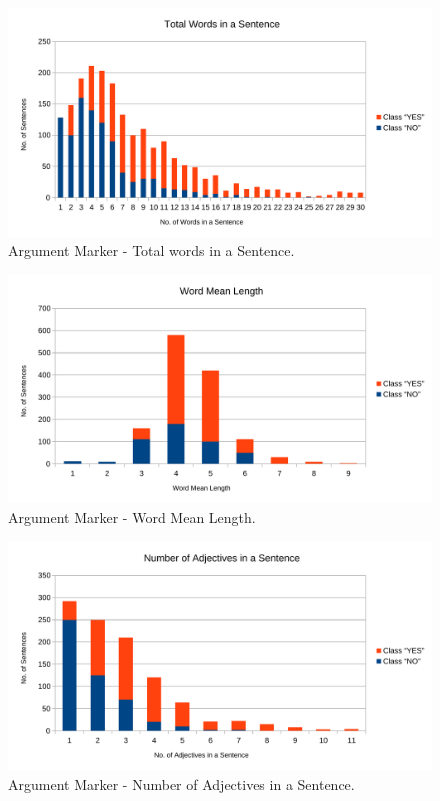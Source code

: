 \begin{figure}[H]
\centering
\includegraphics[width=0.8\linewidth]{figure/arguments/A_total_words1.pdf}
\caption{Argument Marker - Total words in a Sentence.}
\end{figure}

\begin{figure}[H]
\centering
\includegraphics[width=0.8\linewidth]{figure/arguments/A_word_mean_length1.pdf}
\caption{Argument Marker - Word Mean Length.}
\end{figure}

\begin{figure}[H]
\centering
\includegraphics[width=0.8\linewidth]{figure/arguments/A_adjectives1.pdf}
\caption{Argument Marker - Number of Adjectives in a Sentence.}
\end{figure}

